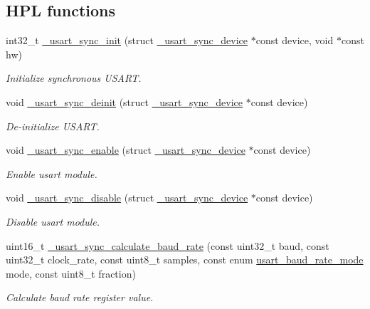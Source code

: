 \subsection*{H\+PL functions}
\begin{DoxyCompactItemize}
\item 
int32\+\_\+t \hyperlink{group___h_p_l_gad1cc7b8e72fd67fdeec8062c802eb25a}{\+\_\+usart\+\_\+sync\+\_\+init} (struct \hyperlink{struct__usart__sync__device}{\+\_\+usart\+\_\+sync\+\_\+device} $\ast$const device, void $\ast$const hw)
\begin{DoxyCompactList}\small\item\em Initialize synchronous U\+S\+A\+RT. \end{DoxyCompactList}\item 
void \hyperlink{group___h_p_l_gac046761a56aaedeba5acad135cab707c}{\+\_\+usart\+\_\+sync\+\_\+deinit} (struct \hyperlink{struct__usart__sync__device}{\+\_\+usart\+\_\+sync\+\_\+device} $\ast$const device)
\begin{DoxyCompactList}\small\item\em De-\/initialize U\+S\+A\+RT. \end{DoxyCompactList}\item 
void \hyperlink{group___h_p_l_ga5ca07057bde212b46f6547e5bdb876de}{\+\_\+usart\+\_\+sync\+\_\+enable} (struct \hyperlink{struct__usart__sync__device}{\+\_\+usart\+\_\+sync\+\_\+device} $\ast$const device)
\begin{DoxyCompactList}\small\item\em Enable usart module. \end{DoxyCompactList}\item 
void \hyperlink{group___h_p_l_gac021f29c77d8a9bfabfdd7433dbbb024}{\+\_\+usart\+\_\+sync\+\_\+disable} (struct \hyperlink{struct__usart__sync__device}{\+\_\+usart\+\_\+sync\+\_\+device} $\ast$const device)
\begin{DoxyCompactList}\small\item\em Disable usart module. \end{DoxyCompactList}\item 
uint16\+\_\+t \hyperlink{group___h_p_l_ga0f2e4f3338270295eea1d4e1b00bfa1e}{\+\_\+usart\+\_\+sync\+\_\+calculate\+\_\+baud\+\_\+rate} (const uint32\+\_\+t baud, const uint32\+\_\+t clock\+\_\+rate, const uint8\+\_\+t samples, const enum \hyperlink{group___h_p_l_ga59141b5eb86f4d53f17bbeab1d7c83e7}{usart\+\_\+baud\+\_\+rate\+\_\+mode} mode, const uint8\+\_\+t fraction)
\begin{DoxyCompactList}\small\item\em Calculate baud rate register value. \end{DoxyCompactList}\item 

\end{DoxyCompactItemize}
